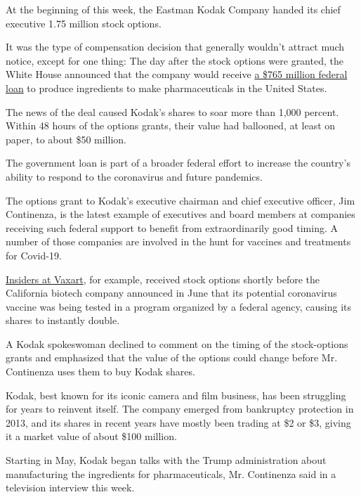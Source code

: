At the beginning of this week, the Eastman Kodak Company handed its
chief executive 1.75 million stock options.

It was the type of compensation decision that generally wouldn't attract
much notice, except for one thing: The day after the stock options were
granted, the White House announced that the company would receive
\href{https://www.nytimes.com/live/2020/07/28/business/stock-market-today-coronavirus\#the-united-states-will-lend-kodak-765-million-to-make-drug-components}{a
\$765 million federal loan} to produce ingredients to make
pharmaceuticals in the United States.

The news of the deal caused Kodak's shares to soar more than 1,000
percent. Within 48 hours of the options grants, their value had
ballooned, at least on paper, to about \$50 million.

The government loan is part of a broader federal effort to increase the
country's ability to respond to the coronavirus and future pandemics.

The options grant to Kodak's executive chairman and chief executive
officer, Jim Continenza, is the latest example of executives and board
members at companies receiving such federal support to benefit from
extraordinarily good timing. A number of those companies are involved in
the hunt for vaccines and treatments for Covid-19.

\href{https://www.nytimes.com/2020/07/25/business/coronavirus-vaccine-profits-vaxart.html}{Insiders
at Vaxart}, for example, received stock options shortly before the
California biotech company announced in June that its potential
coronavirus vaccine was being tested in a program organized by a federal
agency, causing its shares to instantly double.

A Kodak spokeswoman declined to comment on the timing of the
stock-options grants and emphasized that the value of the options could
change before Mr. Continenza uses them to buy Kodak shares.

Kodak, best known for its iconic camera and film business, has been
struggling for years to reinvent itself. The company emerged from
bankruptcy protection in 2013, and its shares in recent years have
mostly been trading at \$2 or \$3, giving it a market value of about
\$100 million.

Starting in May, Kodak began talks with the Trump administration about
manufacturing the ingredients for pharmaceuticals, Mr. Continenza said
in a television interview this week.

